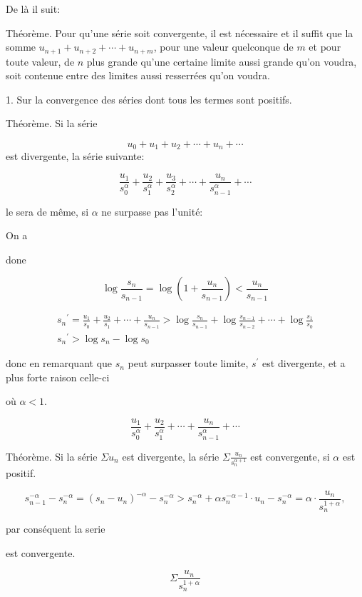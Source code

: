 \documentclass{article}
\begin{document}
De là il suit:

Théorème. Pour qu'une série soit convergente, il est nécessaire et il suffit que la somme \(u_{n+1}+u_{n+2}+\cdots+u_{n+m}\), pour une valeur quelconque de \(m\) et pour toute valeur, de \(n\) plus grande qu'une certaine limite aussi grande qu'on voudra, soit contenue entre des limites aussi resserrées qu'on voudra.

1. Sur la convergence des séries dont tous les termes sont positifs.

Théorème. Si la série

\[
u_{0}+u_{1}+u_{2}+\cdots+u_{n}+\cdots
\]
est divergente, la série suivante:

\[
\frac{u_{1}}{s_{0}^{\alpha}}+\frac{u_{2}}{s_{1}^{\alpha}}+\frac{u_{3}}{s_{2}^{\alpha}}+\cdots+\frac{u_{n}}{s_{n-1}^{\alpha}}+\cdots
\]

le sera de même, si \(\alpha\) ne surpasse pas l'unité:

On a

done

\[
\log \frac{s_{n}}{s_{n-1}}=\log \left(1+\frac{u_{n}}{s_{n-1}}\right)<\frac{u_{n}}{s_{n-1}}
\]

\[
\begin{gathered}
s_{n}{ }^{\prime}=\frac{u_{1}}{s_{0}}+\frac{u_{2}}{s_{1}}+\cdots+\frac{u_{n}}{s_{n-1}}>\log \frac{s_{n}}{s_{n-1}}+\log \frac{s_{n-1}}{s_{n-2}}+\cdots+\log \frac{s_{1}}{s_{0}} \\
s_{n}{ }^{\prime}>\log s_{n}-\log s_{0}
\end{gathered}
\]

donc en remarquant que \(s_{n}\) peut surpasser toute limite, \(s^{\prime}\) est divergente, et a plus forte raison celle-ci

où \(\alpha<1\).

\[
\frac{u_{1}}{s_{0}^{\alpha}}+\frac{u_{2}}{s_{1}^{\alpha}}+\cdots+\frac{u_{n}}{s_{n-1}^{\alpha}}+\cdots
\]

Théorème. Si la série \(\Sigma u_{n}\) est divergente, la série \(\Sigma \frac{u_{n}}{s_{n}^{\alpha+1}}\) est convergente, si \(\alpha\) est positif.

\[
s_{n-1}^{-\alpha}-s_{n}^{-\alpha}=\left(s_{n}-u_{n}\right)^{-\alpha}-s_{n}^{-\alpha}>s_{n}^{-\alpha}+\alpha s_{n}^{-\alpha-1} \cdot u_{n}-s_{n}^{-\alpha}=\alpha \cdot \frac{u_{n}}{s_{n}^{1+\alpha}},
\]

par conséquent la serie

est convergente.

\[
\Sigma \frac{u_{n}}{s_{n}^{1+\alpha}}
\]
\end{document}
